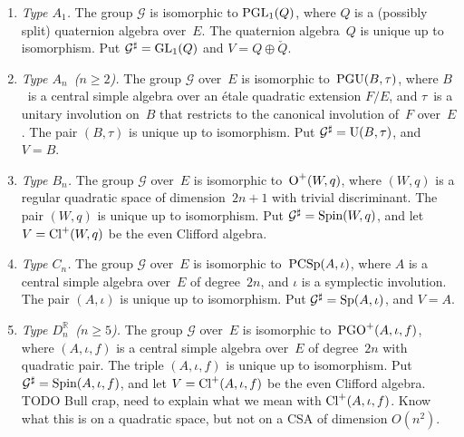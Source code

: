 \documentclass[10pt,twoside,leqno]{article}
\numberwithin{equation}{subsection}
\newcommand{\dual}[1]{\check{#1}}
\newcommand{\RR}{\mathbb{R}}
\newcommand{\GL}{\textnormal{GL}}
\newcommand{\PGL}{\textnormal{PGL}}
\newcommand{\UU}{\textnormal{U}}
\newcommand{\PGU}{\textnormal{PGU}}
\newcommand{\OO}{\textnormal{O}}
\newcommand{\PGO}{\textnormal{PGO}}
\newcommand{\Spin}{\textnormal{Spin}}
\newcommand{\Sp}{\textnormal{Sp}}
\newcommand{\PCSp}{\textnormal{PCSp}}
\newcommand{\Cliff}{\textnormal{Cl}}
\begin{document}
\begin{enumerate}[label=\thesubsection.\arabic*,align=left,%
  itemsep=\baselineskip,topsep=\baselineskip,%
  leftmargin=0pt,labelindent=0pt,labelsep=1ex,labelwidth=6ex,itemindent=!]
 \item \emph{Type \(A_{1}\).}
  The group \(\mathcal{G}\) is isomorphic to \(\PGL_{1}(Q)\),
  where \(Q\) is a (possibly split) quaternion algebra over~\(E\).
  The quaternion algebra~\(Q\) is unique up to isomorphism.
  Put \(\mathcal{G}^{\sharp} = \GL_{1}(Q)\) and \(V = Q \oplus \dual{Q}\).

 \item \emph{Type \(A_{n}\)~(\(n \ge 2\)).}
  The group \(\mathcal{G}\) over~\(E\) is isomorphic to~\(\PGU(B,\tau)\),
  where \(B\)~is a central simple algebra over
  an \'{e}tale quadratic extension \(F/E\),
  and \(\tau\)~is a unitary involution on~\(B\)
  that restricts to the canonical involution of~\(F\) over~\(E\).
  The pair \((B,\tau)\) is unique up to isomorphism.
  Put \(\mathcal{G}^{\sharp} = \UU(B,\tau)\), and \(V = B\).

 \item \emph{Type \(B_{n}\).}
  The group \(\mathcal{G}\) over~\(E\) is isomorphic to~\(\OO^{+}(W,q)\),
  where \((W,q)\) is a regular quadratic space of dimension~\(2n+1\)
  with trivial discriminant.
  The pair \((W,q)\) is unique up to isomorphism.
  Put \(\mathcal{G}^{\sharp} = \Spin(W,q)\),
  and let \(V = \Cliff^{+}(W,q)\) be the even Clifford algebra.

 \item \emph{Type \(C_{n}\).}
  The group \(\mathcal{G}\) over~\(E\) is isomorphic to~\(\PCSp(A,\iota)\),
  where \(A\) is a central simple algebra over~\(E\) of degree~\(2n\),
  and \(\iota\) is a symplectic involution.
  The pair \((A,\iota)\) is unique up to isomorphism.
  Put \(\mathcal{G}^{\sharp} = \Sp(A,\iota)\), and \(V = A\).

 \item \emph{Type \(D_{n}^{\RR}\)~(\(n \ge 5\)).}
  The group \(\mathcal{G}\) over~\(E\) is isomorphic to~\(\PGO^{+}(A,\iota,f)\),
  where \((A,\iota,f)\) is a central simple algebra over~\(E\)
  of degree~\(2n\) with quadratic pair.
  The triple \((A,\iota,f)\) is unique up to isomorphism.
  Put \(\mathcal{G}^{\sharp} = \Spin(A,\iota,f)\),
  and let \(V = \Cliff^{+}(A,\iota,f)\) be the even Clifford algebra.
  TODO %
  Bull crap, need to explain what we mean with \(\Cliff^{+}(A,\iota,f)\).
  Know what this is on a quadratic space,
  but not on a CSA of dimension \(O(n^2)\).


\end{enumerate}
\end{document}
